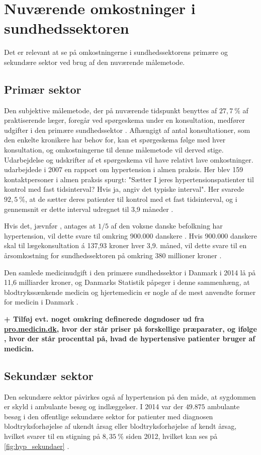\section{Nuværende omkostninger i sundhedssektoren}
Det er relevant at se på omkostningerne i sundhedssektorens primære og sekundære sektor ved brug af den nuværende målemetode. 

\subsection{Primær sektor} \label{sec:nuv_primaer}
Den subjektive målemetode, der på nuværende tidspunkt benyttes af $27,7~\%$ af praktiserende læger, foregår ved spørgeskema under en konsultation, medfører udgifter i den primære sundhedssektor \citep{munck2007}. Afhængigt af antal konsultationer, som den enkelte kronikere har behov for, kan et spørgeskema følge med hver konsultation, og omkostningerne til denne målemetode vil derved stige. Udarbejdelse og udskrifter af et spørgeskema vil have relativt lave omkostninger.
\citeauthor{munck2007} udarbejdede i 2007 en rapport om hypertension i almen praksis. Her blev 159 kontaktpersoner i almen praksis spurgt: "Sætter I jeres hypertensionspatienter til kontrol med fast tidsinterval? Hvis ja, angiv det typiske interval". Her svarede $92,5~\%$, at de sætter deres patienter til kontrol med et fast tidsinterval, og i gennemsnit er dette interval udregnet til 3,9 måneder \citep{munck2007}. 

Hvis det, jævnfør \citeauthor{kronborg2008}, antages at $1/5$ af den voksne danske befolkning har hypertension, vil dette svare til omkring 900.000 danskere \citep{folketal2016}. Hvis 900.000 danskere skal til lægekonsultation á 137,93 kroner hver 3,9. måned, vil dette svare til en årsomkostning for sundhedssektoren på omkring 380 millioner kroner \citep{honorartabel2016}. 

Den samlede medicinudgift i den primære sundhedssektor i Danmark i 2014 lå på 11,6 milliarder kroner, og Danmarks Statistik påpeger i denne sammenhæng, at blodtrykssænkende medicin og hjertemedicin er nogle af de mest anvendte former for medicin i Danmark \citep{dst2016}. 

\textbf{+ Tilføj evt. noget omkring definerede døgndoser ud fra \url{pro.medicin.dk}, hvor der står priser på forskellige præparater, og ifølge \citeauthor{munck2007}, hvor der står procenttal på, hvad de hypertensive patienter bruger af medicin. }

\subsection{Sekundær sektor}
Den sekundære sektor påvirkes også af hypertension på den måde, at sygdommen er skyld i ambulante besøg og indlæggelser. I 2014 var der $49.875$ ambulante besøg i den offentlige sekundære sektor for patienter med diagnosen blodtryksforhøjelse af ukendt årsag eller blodtryksforhøjelse af kendt årsag, hvilket svarer til en stigning på $8,35~\%$ siden 2012, hvilket kan ses på \autoref{fig:hyp_sekundaer} \citep{sundhedsdatastyrelsen2016}. 

